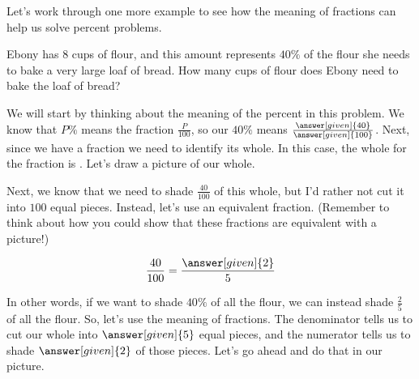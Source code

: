 \documentclass{ximera}
\begin{document}
\begin{question}
\begin{explanation}
\end{explanation}

\end{question}

Let's work through one more example to see how the meaning of fractions can help us solve percent problems.

\begin{question}
Ebony has $8$ cups of flour, and this amount represents $40\%$ of the flour she needs to bake a very large loaf of bread. How many cups of flour does Ebony need to bake the loaf of bread?

\begin{explanation}
We will start by thinking about the meaning of the percent in this problem. We know that $P\%$ means the fraction $\frac{P}{100}$, so our $40\%$ means $\frac{\answer[given]{40}}{\answer[given]{100}}$. Next, since we have a fraction we need to identify its whole. In this case, the whole for the fraction is . Let's draw a picture of our whole.

\begin{image}
\end{image}

Next, we know that we need to shade $\frac{40}{100}$ of this whole, but I'd rather not cut it into $100$ equal pieces. Instead, let's use an equivalent fraction. (Remember to think about how you could show that these fractions are equivalent with a picture!)

\[
\frac{40}{100} = \frac{\answer[given]{2}}{5}
\]

In other words, if we want to shade $40\%$ of all the flour, we can instead shade $\frac{2}{5}$ of all the flour. So, let's use the meaning of fractions. The denominator tells us to cut our whole into $\answer[given]{5}$ equal pieces, and the numerator tells us to shade $\answer[given]{2}$ of those pieces. Let's go ahead and do that in our picture.

\begin{image}
\end{image}


\end{explanation}
\end{question}
\end{document}
